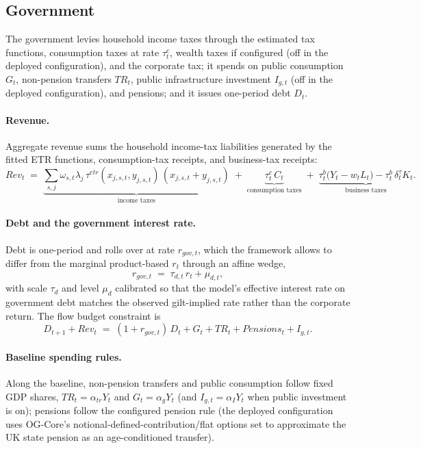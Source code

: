 \subsection{Government}
\label{subsec:government}

The government levies household income taxes through the estimated tax functions, consumption taxes at rate $\tau^c_t$, wealth taxes if configured (off in the deployed configuration), and the corporate tax; it spends on public consumption $G_t$, non-pension transfers $TR_t$, public infrastructure investment $I_{g,t}$ (off in the deployed configuration), and pensions; and it issues one-period debt $D_t$.

\paragraph{Revenue.} Aggregate revenue sums the household income-tax liabilities generated by the fitted ETR functions, consumption-tax receipts, and business-tax receipts:
\begin{equation}
\label{eq:revenue}
Rev_t \;=\; \underbrace{\sum_{s,j}\omega_{s,t}\lambda_j\,\tau^{etr}(x_{j,s,t},y_{j,s,t})\,(x_{j,s,t}+y_{j,s,t})}_{\text{income taxes}}
\;+\; \underbrace{\tau^c_t\, C_t}_{\text{consumption taxes}}
\;+\; \underbrace{\tau^b_t\bigl(Y_t - w_t L_t\bigr) - \tau^b_t\,\delta^\tau_t K_t}_{\text{business taxes}} .
\end{equation}

\paragraph{Debt and the government interest rate.} Debt is one-period and rolls over at rate $r_{gov,t}$, which the framework allows to differ from the marginal product-based $r_t$ through an affine wedge,
\begin{equation}
\label{eq:rgov}
r_{gov,t} \;=\; \tau_{d,t}\, r_t + \mu_{d,t},
\end{equation}
with scale $\tau_d$ and level $\mu_d$ calibrated so that the model's effective interest rate on government debt matches the observed gilt-implied rate rather than the corporate return. The flow budget constraint is
\begin{equation}
\label{eq:govbc}
D_{t+1} + Rev_t \;=\; (1+r_{gov,t})\,D_t + G_t + TR_t + Pensions_t + I_{g,t}.
\end{equation}

\paragraph{Baseline spending rules.} Along the baseline, non-pension transfers and public consumption follow fixed GDP shares, $TR_t = \alpha_{tr} Y_t$ and $G_t = \alpha_g Y_t$ (and $I_{g,t} = \alpha_I Y_t$ when public investment is on); pensions follow the configured pension rule (the deployed configuration uses OG-Core's notional-defined-contribution/flat options set to approximate the UK state pension as an age-conditioned transfer).

